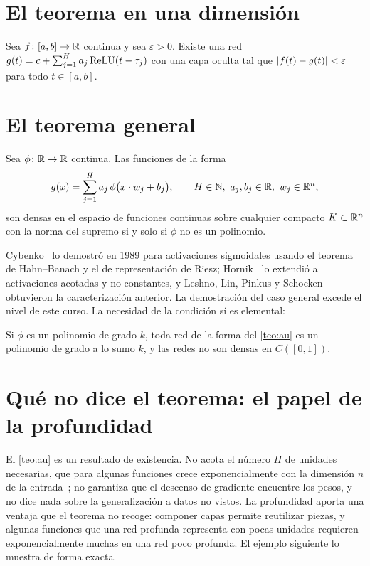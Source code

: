 \section{El teorema en una dimensión}

\begin{teorema}\label{teo:au1d}
Sea $f\colon[a,b]\to\mathbb{R}$ continua y sea $\varepsilon>0$. Existe una red $g(t)=c+\sum_{j=1}^{H}a_j\operatorname{ReLU}(t-\tau_j)$ con una capa oculta tal que $\lvert f(t)-g(t)\rvert<\varepsilon$ para todo $t\in[a,b]$.
\end{teorema}

\addtocounter{definicion}{1}%

\section{El teorema general}

\begin{teorema}\label{teo:au}
Sea $\phi\colon\mathbb{R}\to\mathbb{R}$ continua. Las funciones de la forma
\[
g(x)=\sum_{j=1}^{H}a_j\,\phi\bigl(x\cdot w_j+b_j\bigr),\qquad H\in\mathbb{N},\ a_j,b_j\in\R,\ w_j\in\R^{n},
\]
son densas en el espacio de funciones continuas sobre cualquier compacto $K\subset\mathbb{R}^{n}$ con la norma del supremo si y solo si $\phi$ no es un polinomio.
\end{teorema}

Cybenko~\cite{cybenko} lo demostró en 1989 para activaciones sigmoidales usando el teorema de Hahn--Banach y el de representación de Riesz; Hornik~\cite{hornik} lo extendió a activaciones acotadas y no constantes, y Leshno, Lin, Pinkus y Schocken~\cite{leshno} obtuvieron la caracterización anterior. La demostración del caso general excede el nivel de este curso. La necesidad de la condición sí es elemental:

\begin{proposicion}\label{prop:polinomio}
Si $\phi$ es un polinomio de grado $k$, toda red de la forma del \cref{teo:au} es un polinomio de grado a lo sumo $k$, y las redes no son densas en $C([0,1])$.
\end{proposicion}

\section{Qué no dice el teorema: el papel de la profundidad}

El \cref{teo:au} es un resultado de existencia. No acota el número $H$ de unidades necesarias, que para algunas funciones crece exponencialmente con la dimensión $n$ de la entrada~\cite[§6.4.1]{gbc}; no garantiza que el descenso de gradiente encuentre los pesos, y no dice nada sobre la generalización a datos no vistos. La profundidad aporta una ventaja que el teorema no recoge: componer capas permite reutilizar piezas, y algunas funciones que una red profunda representa con pocas unidades requieren exponencialmente muchas en una red poco profunda. El ejemplo siguiente lo muestra de forma exacta.

